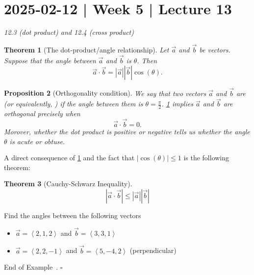 \documentclass[10pt]{article}
\newtheorem{theorem}{Theorem}
\newtheorem{proposition}[theorem]{Proposition}
\theoremstyle{definition}
\newtheorem{example}[theorem]{Example}
\renewenvironment{example}
{\begin{oldexample}}
  {\par\smallskip\hfill   End of Example~\theexample. $\square$    \par\end{oldexample}}
\newcommand{\1}[1]{\textbf{1}_{\left[#1\right]}} %
\newcommand{\dempfcolor}[1]{{\color{RoyalBlue}#1}}
\newcommand{\demph}[1]{\dempfcolor{{\sl #1}}}
\begin{document}
\section{2025-02-12 | Week 5 | Lecture 13}
\textit{12.3 (dot product) and 12.4 (cross product)}

\begin{theorem}[The dot-product/angle relationship]
  \label{thm:dot-productangle-relationship}
  Let $\vec{a}$ and $\vec{b}$ be vectors. Suppose that the angle between $\vec{a}$ and $\vec{b}$ is
  $\theta$. Then
  \begin{equation*}
    \vec{a}\cdot \vec{b} = | \vec{a} | |\vec{b}| \cos(\theta).
  \end{equation*}
\end{theorem}

\begin{proposition}[Orthogonality condition]
  We say that two vectors $\vec{a}$ and $\vec{b}$ are \demph{orthogonal} (or equivalently,
  \demph{perpendicular}) if the angle between them is $\theta=\frac{\pi}{2}$.
  \cref{thm:dot-productangle-relationship} implies $\vec{a}$ and $\vec{b}$ are orthogonal precisely
  when
  \begin{equation*}
    \vec{a}\cdot \vec{b} = 0.
  \end{equation*}
  Morover, whether the dot product is positive or negative tells us whether the angle $\theta$ is acute
  or obtuse.
\end{proposition}

A direct consequence of \cref{thm:dot-productangle-relationship} and the fact that $\left| \cos(\theta)
\right| \leq 1$ is the following theorem:

\begin{theorem}[Cauchy-Schwarz Inequality]
  \label{thm:cauchy-shwarz-inequality}
  \begin{equation*}
    | \vec{a}\cdot \vec{b} | \leq | \vec{a} || \vec{b} |
  \end{equation*}
\end{theorem}


\begin{example}
  Find the angles between the following vectors
  \begin{itemize}
    \item $\vec{a} = \left\langle 2,1,2 \right\rangle $ and $\vec{b}=\left\langle 3,3,1 \right\rangle $ 
    \item $\vec{a} = \left\langle 2,2,-1 \right\rangle $ and $\vec{b}=\left\langle 5,-4,2 \right\rangle $ (perpendicular)
  \end{itemize}
\end{example}
\end{document}
